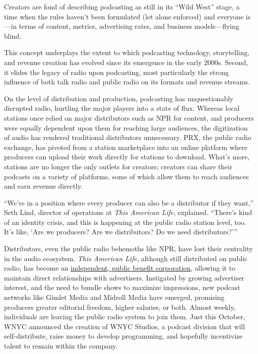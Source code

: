 \documentclass[notoc, symmetric, nobib, nols]{towcenter-guideto-book}
\begin{document}
Creators are fond of describing podcasting as still in its ``Wild West'' stage, a time when the rules haven't been formulated (let alone enforced) and everyone is---in terms of content, metrics, advertising rates, and business models---flying blind. 

This concept underplays the extent to which podcasting technology, storytelling, and revenue creation has evolved since its emergence in the early 2000s. Second, it elides the legacy of radio upon podcasting, most particularly the strong influence of both talk radio and public radio on its formats and revenue streams. 

On the level of distribution and production, podcasting has unquestionably disrupted radio, hurtling the major players into a state of flux. Whereas local stations once relied on major distributors such as NPR for content, and producers were equally dependent upon them for reaching large audiences, the digitization of audio has rendered traditional distributors unnecessary. PRX, the public radio exchange, has pivoted from a station marketplace into an online platform where producers can upload their work directly for stations to download. What's more, stations are no longer the only outlets for creators; creators can share their podcasts on a variety of platforms, some of which allow them to reach audiences and earn revenue directly.

``We're in a position where every producer can also be a distributor if they want,'' Seth Lind, director of operations at \textit{This American Life}, explained. ``There's kind of an identity crisis, and this is happening at the public radio station level, too. It's like, `Are we producers? Are we distributors? Do we need distributors?'''\autocite{lind}

Distributors, even the public radio behemoths like NPR, have lost their centrality in the audio ecosystem. \textit{This American Life}, although still distributed on public radio, has become an \href{http://current.org/2015/07/ira-glass-starts-own-company-for-this-american-life-serial/}{independent, public benefit corporation}, allowing it to maintain direct relationships with advertisers.\autocite{talpbc} Instigated by growing advertiser interest, and the need to bundle shows to maximize impressions, new podcast networks like Gimlet Media and Midroll Media have emerged, promising producers greater editorial freedom, higher salaries, or both. Almost weekly, individuals are leaving the public radio system to join them. Just this October, WNYC announced the creation of WNYC Studios, a podcast division that will self-distribute, raise money to develop programming, and hopefully incentivize talent to remain within the company.\autocite{wnycstudios}
\end{document}

